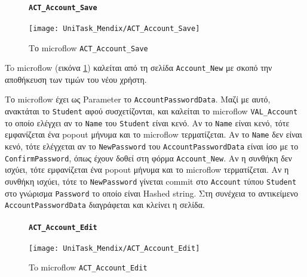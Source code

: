                 \begin{figure}[H] \noindent
                    \paragraph{\texttt{ACT\_Account\_Save}}
                    \begin{center}
                        \texttt{[image: UniTask\_Mendix/ACT\_Account\_Save]}
                        \caption{\centering Το microflow \texttt{ACT\_Account\_Save}}
                        \label{fig:unitask_ACT_Account_Save}
                    \end{center}
                \end{figure}

                    To microflow (εικόνα \ref{fig:unitask_ACT_Account_Save}) καλείται από τη σελίδα \texttt{Account\_New} με σκοπό την αποθήκευση των τιμών του νέου χρήστη.

                    Το microflow έχει ως Parameter το \texttt{AccountPasswordData}. Μαζί με αυτό, ανακτάται το \texttt{Student} αφού συσχετίζονται, και καλείται το microflow \texttt{VAL\_Account} το οποίο ελέγχει αν το \texttt{Name} του \texttt{Student} είναι κενό. Αν το \texttt{Name} είναι κενό, τότε εμφανίζεται ένα popout μήνυμα και το microflow τερματίζεται. Αν το \texttt{Name} δεν είναι κενό, τότε ελέγχεται αν το \texttt{NewPassword} του \texttt{AccountPasswordData} είναι ίσο με το \texttt{ConfirmPassword}, όπως έχουν δοθεί στη φόρμα \texttt{Account\_New}. Αν η συνθήκη δεν ισχύει, τότε εμφανίζεται ένα popout μήνυμα και το microflow τερματίζεται. Αν η συνθήκη ισχύει, τότε το \texttt{NewPassword} γίνεται commit στο \texttt{Account} τύπου \texttt{Student} στο γνώρισμα \texttt{Password} το οποίο είναι Hashed string. Στη συνέχεια το αντικείμενο \texttt{AccountPasswordData} διαγράφεται και κλείνει η σελίδα.

                \begin{figure}[H] \noindent
                    \paragraph{\texttt{ACT\_Account\_Edit}}
                    \begin{center}
                        \texttt{[image: UniTask\_Mendix/ACT\_Account\_Edit]}
                        \caption{\centering To microflow \texttt{ACT\_Account\_Edit}}
                        \label{fig:unitask_ACT_Account_Edit}
                    \end{center}
                \end{figure}

